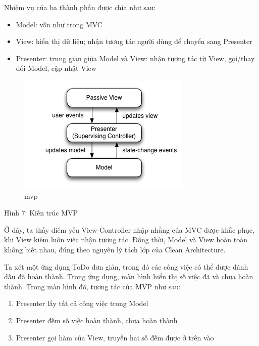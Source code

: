 Nhiệm vụ của ba thành phần được chia như sau:

\begin{itemize}
  
  \item
        Model: vẫn như trong MVC
  \item
        View: hiển thị dữ liệu; nhận tương tác người dùng để chuyển sang
        Presenter
  \item
        Presenter: trung gian giữa Model và View: nhận tương tác từ View,
        gọi/thay đổi Model, cập nhật View
\end{itemize}

\begin{figure}
  \centering
  \includegraphics{../images/Model_View_Presenter_GUI_Design_Pattern.png}
  \caption{mvp}
\end{figure}

Hình 7: Kiến trúc MVP

Ở đây, ta thấy điểm yếu View-Controller nhập nhằng của MVC được khắc
phục, khi View kiêm luôn việc nhận tương tác. Đồng thời, Model và View
hoàn toàn không biết nhau, đúng theo nguyên lý tách lớp của Clean
Architecture.

Ta xét một ứng dụng ToDo đơn giản, trong đó các công việc có thể được
đánh dấu đã hoàn thành. Trong ứng dụng, màn hình hiển thị số việc đã và
chưa hoàn thành. Trong màn hình đó, tương tác của MVP như sau:

\begin{enumerate}
  \def\labelenumi{\arabic{enumi}.}
  
  \item
        Presenter lấy tất cả công việc trong Model
  \item
        Presenter đếm số việc hoàn thành, chưa hoàn thành
  \item
        Presenter gọi hàm của View, truyền hai số đếm được ở trên vào
\end{enumerate}

